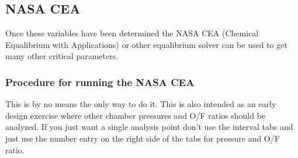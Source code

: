 \documentclass[12pt, letter paper]{article}
\begin{document}
		\subsection{NASA CEA}
			Once these variables have been determined the NASA CEA (Chemical Equalibrium with Applications) or other equalibrium solver can be used to get many other critical parameters.
			\subsubsection{Procedure for running the NASA CEA}
				This is by no means the only way to do it. This is also intended as an early design exercise where other chamber pressures and O/F ratios should be analyzed. 
				If you just want a single analysis point don't use the interval tabs and just use the number entry on the right side of the tabs for pressure and O/F ratio.
\end{document}
